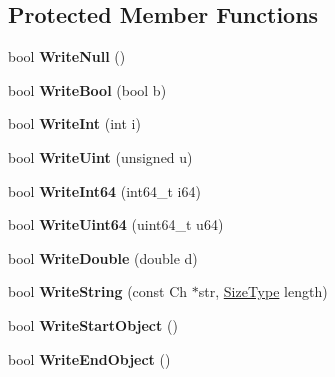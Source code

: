 \subsection*{Protected Member Functions}
\begin{DoxyCompactItemize}
\item 
bool {\bfseries Write\+Null} ()\hypertarget{class_writer_af4f79d39ad69cbbc7976565dd257b436}{}\label{class_writer_af4f79d39ad69cbbc7976565dd257b436}

\item 
bool {\bfseries Write\+Bool} (bool b)\hypertarget{class_writer_a21f1adc6a520084ed4f39522ed9f4540}{}\label{class_writer_a21f1adc6a520084ed4f39522ed9f4540}

\item 
bool {\bfseries Write\+Int} (int i)\hypertarget{class_writer_acc42b38b43ae1488fc2e779c8a333d34}{}\label{class_writer_acc42b38b43ae1488fc2e779c8a333d34}

\item 
bool {\bfseries Write\+Uint} (unsigned u)\hypertarget{class_writer_aa7e4196f87bfa66c9619e0efd15d16ea}{}\label{class_writer_aa7e4196f87bfa66c9619e0efd15d16ea}

\item 
bool {\bfseries Write\+Int64} (int64\+\_\+t i64)\hypertarget{class_writer_ad68f4e0a85cc944a0740200544c97ed9}{}\label{class_writer_ad68f4e0a85cc944a0740200544c97ed9}

\item 
bool {\bfseries Write\+Uint64} (uint64\+\_\+t u64)\hypertarget{class_writer_ac3d17e9409c202e39b0cd887545783d6}{}\label{class_writer_ac3d17e9409c202e39b0cd887545783d6}

\item 
bool {\bfseries Write\+Double} (double d)\hypertarget{class_writer_aced9cb2b88abc16c4a0bdb75920cd424}{}\label{class_writer_aced9cb2b88abc16c4a0bdb75920cd424}

\item 
bool {\bfseries Write\+String} (const Ch $\ast$str, \hyperlink{rapidjson_8h_a5ed6e6e67250fadbd041127e6386dcb5}{Size\+Type} length)\hypertarget{class_writer_aab4926d061472149998b89b4d34e1a4b}{}\label{class_writer_aab4926d061472149998b89b4d34e1a4b}

\item 
bool {\bfseries Write\+Start\+Object} ()\hypertarget{class_writer_ad3578f94664c62e6b0773f4dc0567a17}{}\label{class_writer_ad3578f94664c62e6b0773f4dc0567a17}

\item 
bool {\bfseries Write\+End\+Object} ()\hypertarget{class_writer_a9f76fcffaf403a49a311de074a23de2d}{}\label{class_writer_a9f76fcffaf403a49a311de074a23de2d}


\end{DoxyCompactItemize}
